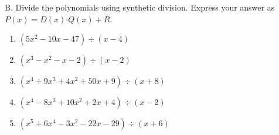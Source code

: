 B. Divide the polynomials using synthetic division. Express your answer as  $P(x)  =D(x) \boldsymbol{\cdot} Q(x) +R$. 

\begin{enumerate}[label = \arabic*. ]
\item \hspce \hspce $(5x^2-10x-47) \div (x-4)$
\vspce
\item \hspce \hspce $(x^3-x^2-x-2) \div (x-2)$
\vspce
\item \hspce \hspce $(x^4+9x^3+4x^2+50x+9) \div (x+8)$
\vspce
\item \hspce \hspce $(x^4-8x^3+10x^2+2x+4) \div (x-2)$
\vspce
\item \hspce \hspce $(x^5+6x^4-3x^2-22x-29) \div (x+6)$


\end{enumerate} 
